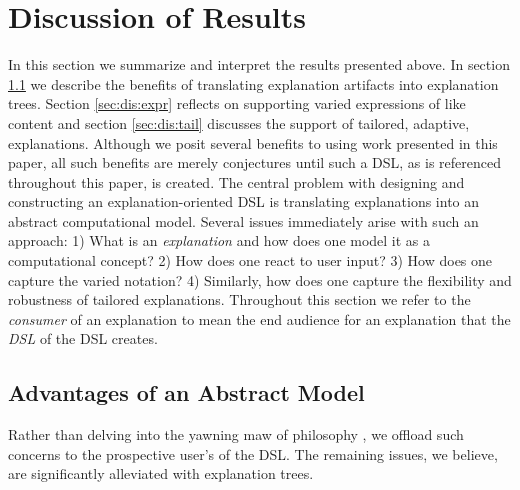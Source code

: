 \documentclass[sigconf]{acmart}
\begin{document}
\section{Discussion of Results}
In this section we summarize and interpret the results presented above. In
section \ref{sec:dis:model} we describe the benefits of translating
explanation artifacts into explanation trees. Section \ref{sec:dis:expr} reflects
on supporting varied expressions of like content and section \ref{sec:dis:tail}
discusses the support of tailored, adaptive, explanations. Although we posit
several benefits to using work presented in this paper, all such benefits are
merely conjectures until such a DSL, as is referenced throughout this paper, is
created. 
%
The central problem with designing and constructing an explanation-oriented DSL
is translating explanations into an abstract computational model. Several issues
immediately arise with such an approach: 1) What is an \emph{explanation} and
how does one model it as a computational concept? 2) How does one react to user
input? 3) How does one capture the varied notation? 4) Similarly, how does one
capture the flexibility and robustness of tailored explanations. Throughout this
section we refer to the \emph{consumer} of an explanation to mean the end audience
for an explanation that the \emph{DSL} of the DSL creates. 

\subsection{Advantages of an Abstract Model}
\label{sec:dis:model}

Rather than delving into the yawning maw of philosophy , we offload such concerns to the prospective user's
of the DSL. The remaining issues, we believe, are significantly alleviated with
explanation trees.
\end{document}
